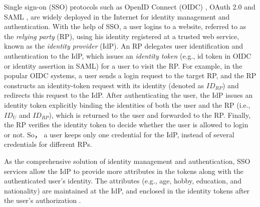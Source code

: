 Single sign-on (SSO) protocols such as OpenID Connect (OIDC) \cite{OpenIDConnect}, OAuth 2.0 \cite{rfc6749} and SAML \cite{SAML,SAMLIdentifier},
 are widely deployed in the Internet for identity management and authentication.
 With the help of SSO,
  a user logins to a website, referred to as the \emph{relying party} (RP), using his identity registered at a trusted web service,
   known as the \emph{identity provider} (IdP).
An RP delegates user identification and authentication to the IdP,
    which issues an \emph{identity token} (e.g., id token in OIDC or identity assertion in SAML) for a user to visit the RP. %
%
%
For example, in the popular OIDC systems,
     a user sends a login request to the target RP, %
and the RP constructs an identity-token request with its identity (denoted as $ID_{RP}$) and redirects this request to the IdP.
After authenticating the user,
 the IdP issues an identity token explicitly binding the identities of both the user and the RP (i.e., $ID_U$ and $ID_{RP}$),
    which is returned to the user and forwarded to the RP. %
Finally, the RP verifies the identity token to decide whether the user is allowed to login or not.
So， a user keeps only one credential for the IdP, instead of several credentials for different RPs.

As the comprehensive solution of identity management and authentication,
    SSO services allow the IdP to provide more attributes in the tokens
        along with the authenticated user's identity.
The attributes (e.g., age, hobby, education, and nationality) are maintained at the IdP,
    and enclosed in the identity tokens after the user's authorization \cite{OpenIDConnect,rfc6749}.

